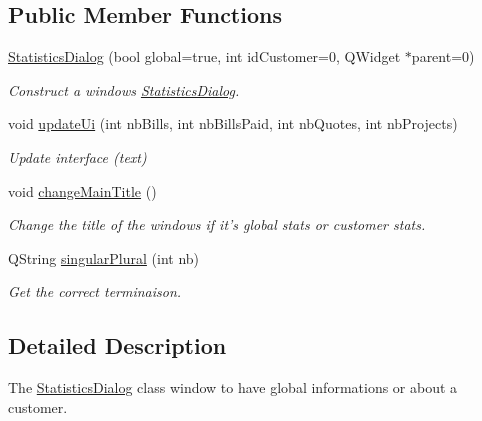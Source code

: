\subsection*{Public Member Functions}
\begin{DoxyCompactItemize}
\item 
\hyperlink{classGui_1_1Dialogs_1_1StatisticsDialog_a6fe5b8b662958e2740f7a5905168bca9}{Statistics\-Dialog} (bool global=true, int id\-Customer=0, Q\-Widget $\ast$parent=0)
\begin{DoxyCompactList}\small\item\em Construct a windows \hyperlink{classGui_1_1Dialogs_1_1StatisticsDialog}{Statistics\-Dialog}. \end{DoxyCompactList}\item 
void \hyperlink{classGui_1_1Dialogs_1_1StatisticsDialog_a8b453ddc439c0f828eca1417fbc74003}{update\-Ui} (int nb\-Bills, int nb\-Bills\-Paid, int nb\-Quotes, int nb\-Projects)
\begin{DoxyCompactList}\small\item\em Update interface (text) \end{DoxyCompactList}\item 
\hypertarget{classGui_1_1Dialogs_1_1StatisticsDialog_ad4a1943006ec0126e0eaf0f30d5d40ef}{void \hyperlink{classGui_1_1Dialogs_1_1StatisticsDialog_ad4a1943006ec0126e0eaf0f30d5d40ef}{change\-Main\-Title} ()}\label{classGui_1_1Dialogs_1_1StatisticsDialog_ad4a1943006ec0126e0eaf0f30d5d40ef}

\begin{DoxyCompactList}\small\item\em Change the title of the windows if it's global stats or customer stats. \end{DoxyCompactList}\item 
Q\-String \hyperlink{classGui_1_1Dialogs_1_1StatisticsDialog_a8284c2ac0cc4c953d928ef9552a83096}{singular\-Plural} (int nb)
\begin{DoxyCompactList}\small\item\em Get the correct terminaison. \end{DoxyCompactList}\end{DoxyCompactItemize}


\subsection{Detailed Description}
The \hyperlink{classGui_1_1Dialogs_1_1StatisticsDialog}{Statistics\-Dialog} class window to have global informations or about a customer. 

